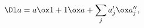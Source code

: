 \begin{equation}
\Dl a = a \ox 1 + 1 \ox a + \sum_j a'_j \ox  a''_j,
\label{eq:gr-coprod-full}%
\end{equation}

